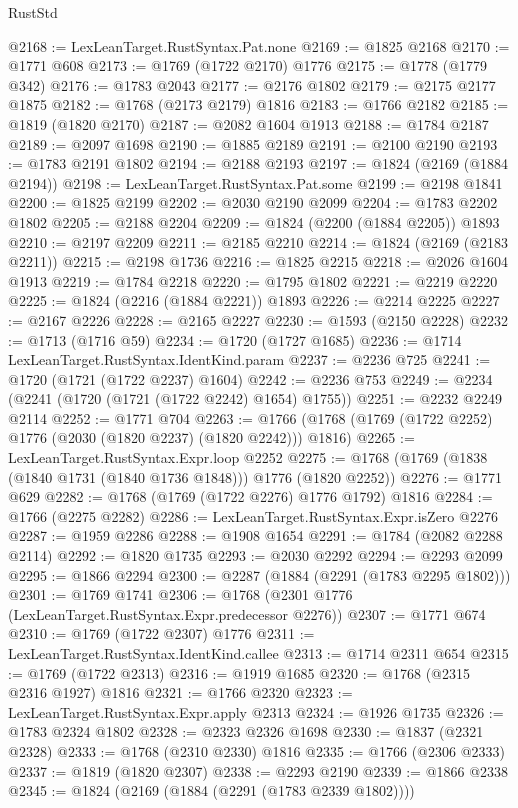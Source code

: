 \begin{lexlean}{RustStd}
\begin{coremodule}
{\begin{coremodule}
{{{{{{{{{{{{{{{{{{{{{{{{{{{{{{{{{{{{{{{{{{{{{{{@2168 := LexLeanTarget.RustSyntax.Pat.none
@2169 := @1825 @2168
@2170 := @1771 @608
@2173 := @1769 (@1722 @2170) @1776
@2175 := @1778 (@1779 @342)
@2176 := @1783 @2043
@2177 := @2176 @1802
@2179 := @2175 @2177 @1875
@2182 := @1768 (@2173 @2179) @1816
@2183 := @1766 @2182
@2185 := @1819 (@1820 @2170)
@2187 := @2082 @1604 @1913
@2188 := @1784 @2187
@2189 := @2097 @1698
@2190 := @1885 @2189
@2191 := @2100 @2190
@2193 := @1783 @2191 @1802
@2194 := @2188 @2193
@2197 := @1824 (@2169 (@1884 @2194))
@2198 := LexLeanTarget.RustSyntax.Pat.some
@2199 := @2198 @1841
@2200 := @1825 @2199
@2202 := @2030 @2190 @2099
@2204 := @1783 @2202 @1802
@2205 := @2188 @2204
@2209 := @1824 (@2200 (@1884 @2205)) @1893
@2210 := @2197 @2209
@2211 := @2185 @2210
@2214 := @1824 (@2169 (@2183 @2211))
@2215 := @2198 @1736
@2216 := @1825 @2215
@2218 := @2026 @1604 @1913
@2219 := @1784 @2218
@2220 := @1795 @1802
@2221 := @2219 @2220
@2225 := @1824 (@2216 (@1884 @2221)) @1893
@2226 := @2214 @2225
@2227 := @2167 @2226
@2228 := @2165 @2227
@2230 := @1593 (@2150 @2228)
@2232 := @1713 (@1716 @59)
@2234 := @1720 (@1727 @1685)
@2236 := @1714 LexLeanTarget.RustSyntax.IdentKind.param
@2237 := @2236 @725
@2241 := @1720 (@1721 (@1722 @2237) @1604)
@2242 := @2236 @753
@2249 := @2234 (@2241 (@1720 (@1721 (@1722 @2242) @1654) @1755))
@2251 := @2232 @2249 @2114
@2252 := @1771 @704
@2263 := @1766 (@1768 (@1769 (@1722 @2252) @1776 (@2030 (@1820 @2237) (@1820 @2242))) @1816)
@2265 := LexLeanTarget.RustSyntax.Expr.loop @2252
@2275 := @1768 (@1769 (@1838 (@1840 @1731 (@1840 @1736 @1848))) @1776 (@1820 @2252))
@2276 := @1771 @629
@2282 := @1768 (@1769 (@1722 @2276) @1776 @1792) @1816
@2284 := @1766 (@2275 @2282)
@2286 := LexLeanTarget.RustSyntax.Expr.isZero @2276
@2287 := @1959 @2286
@2288 := @1908 @1654
@2291 := @1784 (@2082 @2288 @2114)
@2292 := @1820 @1735
@2293 := @2030 @2292
@2294 := @2293 @2099
@2295 := @1866 @2294
@2300 := @2287 (@1884 (@2291 (@1783 @2295 @1802)))
@2301 := @1769 @1741
@2306 := @1768 (@2301 @1776 (LexLeanTarget.RustSyntax.Expr.predecessor @2276))
@2307 := @1771 @674
@2310 := @1769 (@1722 @2307) @1776
@2311 := LexLeanTarget.RustSyntax.IdentKind.callee
@2313 := @1714 @2311 @654
@2315 := @1769 (@1722 @2313)
@2316 := @1919 @1685
@2320 := @1768 (@2315 @2316 @1927) @1816
@2321 := @1766 @2320
@2323 := LexLeanTarget.RustSyntax.Expr.apply @2313
@2324 := @1926 @1735
@2326 := @1783 @2324 @1802
@2328 := @2323 @2326 @1698
@2330 := @1837 (@2321 @2328)
@2333 := @1768 (@2310 @2330) @1816
@2335 := @1766 (@2306 @2333)
@2337 := @1819 (@1820 @2307)
@2338 := @2293 @2190
@2339 := @1866 @2338
@2345 := @1824 (@2169 (@1884 (@2291 (@1783 @2339 @1802))))
}}}}}}}}}}}}}}}}}}}}}}}}}}}}}}}}}}}}}}}}}}}}}}}
\end{coremodule}}
\end{coremodule}
\end{lexlean}
